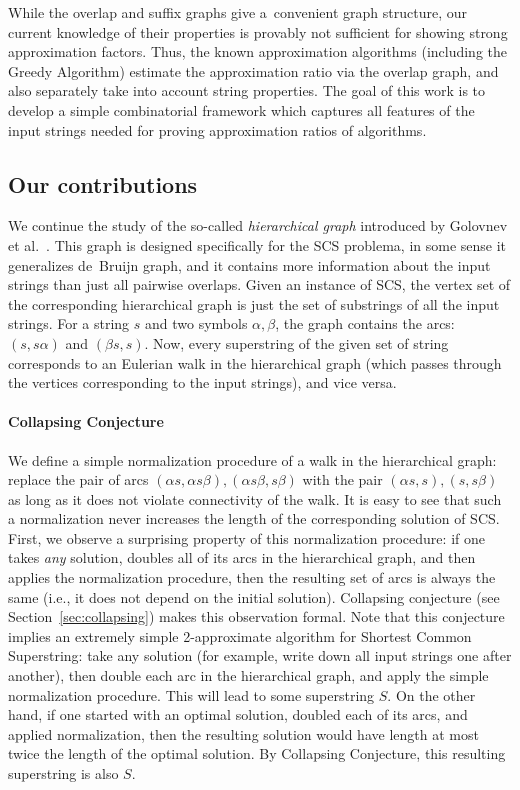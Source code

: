 While the overlap and suffix graphs give a~convenient graph structure, our current knowledge of their properties is provably not sufficient for showing strong approximation factors. Thus, the known approximation algorithms (including the Greedy Algorithm) estimate the approximation ratio via the overlap graph, and also separately take into account string properties. The goal of this work is to develop a simple combinatorial framework which captures all features of the input strings needed for proving approximation ratios of algorithms.

\subsection{Our contributions}
We continue the study of the so-called {\em hierarchical graph}
introduced by Golovnev et al.~\cite{scs_exact}. This graph is designed specifically 
for the SCS problema, in some sense it generalizes de~Bruijn graph, and it contains more information about the input strings
than just all pairwise overlaps. Given an instance of SCS, the vertex set of the corresponding hierarchical graph is just the set of substrings of all the input strings. For a string $s$ and two symbols $\alpha, \beta$, the graph contains the arcs: $(s,s\alpha)$ and $(\beta s, s)$. Now, every superstring of the given set of string corresponds to an Eulerian walk in the hierarchical graph (which passes through the vertices corresponding to the input strings), and vice versa. 

\paragraph{Collapsing Conjecture}
We define a simple normalization procedure of a walk in the hierarchical graph: replace the pair of arcs $(\alpha s, \alpha s \beta), (\alpha s \beta, s\beta)$ with the pair $(\alpha s, s ), (s , s\beta)$ as long as it does not violate connectivity of the walk. It is easy to see that such a normalization never increases the length of the corresponding solution of SCS. 
First, we observe a surprising property of this normalization procedure: if one takes \emph{any} solution, doubles all of its arcs in the hierarchical graph, and then applies the normalization procedure, then the resulting set of arcs is always the same (i.e., it does not depend on the initial solution). Collapsing conjecture (see Section~\ref{sec:collapsing}) makes this observation formal. Note that this conjecture implies an extremely simple 2-approximate algorithm for Shortest Common Superstring: take any solution (for example, write down all input strings one after another), then double each arc in the hierarchical graph, and apply the simple normalization procedure. This will lead to some superstring $S$. On the other hand, if one started with an optimal solution, doubled each of its arcs, and applied normalization, then the resulting solution would have length at most twice the length of the optimal solution. By Collapsing Conjecture, this resulting superstring is also $S$.


